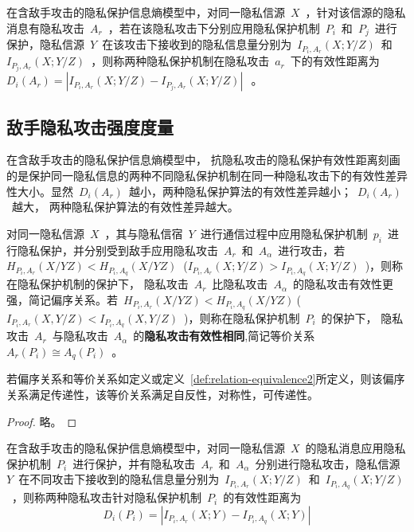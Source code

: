 \begin{definition}[抗隐私攻击的隐私保护有效性距离]
	\label{def:privacy-preserving-performance-distance}
	在含敌手攻击的隐私保护信息熵模型中，对同一隐私信源~$X$~，针对该信源的隐私消息有隐私攻击~$A_{r}$~，若在该隐私攻击下分别应用隐私保护机制~$P_{i}$~和~$P_{j}$~进行保护，隐私信源~$Y$~在该攻击下接收到的隐私信息量分别为~$I_{P_{i},A_{r}}(X;Y/Z)$~和~$I_{P_{j},A_{r}}(X;Y/Z)$~，则称两种隐私保护机制在隐私攻击~$a_{r}$~下的有效性距离为~$D_{i}(A_{r})=\left | I_{P_{i},A_{r}}(X;Y/Z)-I_{P_{j},A_{r}}(X;Y/Z) \right |~$~。
\end{definition}

\subsection{敌手隐私攻击强度度量}
在含敌手攻击的隐私保护信息熵模型中， 抗隐私攻击的隐私保护有效性距离刻画的是保护同一隐私信息的两种不同隐私保护机制在同一种隐私攻击下的有效性差异性大小。显然~$D_{i}(A_{r})$~越小，两种隐私保护算法的有效性差异越小；~$D_{i}(A_{r})$~越大， 两种隐私保护算法的有效性差异越大。

\begin{definition}
	\label{def:relation-equivalence2}
	 对同一隐私信源~$X$~，其与隐私信宿~$Y$~进行通信过程中应用隐私保护机制~$p_{i}$~进行隐私保护，并分别受到敌手应用隐私攻击~$A_{r}$~和~$A_{\alpha }$~进行攻击，若~${{H}_{{{P}_{i}},{{A}_{r}}}}(X/YZ)<{{H}_{{{P}_{i}},{{A}_{q}}}}(X/YZ)~$ (${{I}_{{{P}_{i}},{{A}_{r}}}}(X;Y/Z)>{{I}_{{{P}_{i}},{{A}_{q}}}}(X;Y/Z)$~)，则称在隐私保护机制的保护下， 隐私攻击~$A_{r}$~比隐私攻击~$A_{\alpha }$~的隐私攻击有效性更强，简记偏序关系。若~$H_{P_{i},A_{r}}(X/YZ)<H_{P_{i},A_{q}}(X/YZ)~$(~$I_{P_{i},A_{r}}(X,Y/Z)<I_{P_{i},A_{q}}(X,Y/Z)$~)，则称在隐私保护机制~$P_{i}$~的保护下， 隐私攻击~$A_{r}$~与隐私攻击~$A_{\alpha }$~的\textbf{隐私攻击有效性相同},简记等价关系~$A_{r}(P_{i})\cong A_{q}(P_{i})$~。
\end{definition}

\begin{theorem}
	\label{thm:relation-equivalence}
	若偏序关系和等价关系如定义\label{def:relation-equivalence1}或定义~\ref{def:relation-equivalence2}所定义，则该偏序关系满足传递性，该等价关系满足自反性，对称性，可传递性。 
\end{theorem}

\begin{proof}
 略。
\end{proof}


\begin{definition}[隐私攻击有效性距离]
	\label{def:privacy-attack-distance}
	在含敌手攻击的隐私保护信息熵模型中，对同一隐私信源~$X$~的隐私消息应用隐私保护机制~$P_{i}$~进行保护，并有隐私攻击~$A_{r}$~和~$A_{\alpha}$~分别进行隐私攻击，隐私信源~$Y$~在不同攻击下接收到的隐私信息量分别为~$I_{P_{i},A_{r}}(X;Y/Z)$~和~$I_{P_{i},A_{q}}(X;Y/Z)$~，则称两种隐私攻击针对隐私保护机制~$P_{i}$~的有效性距离为
\begin{equation}
D_{i}(P_{i})=\left | I_{P_{i},A_{r}}(X;Y)-I_{P_{i},A_{q}}(X;Y) \right |
\end{equation}
\end{definition}

